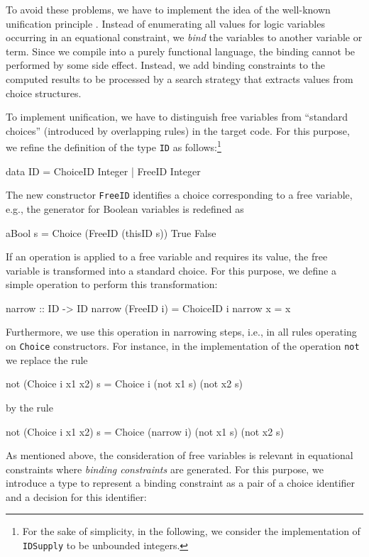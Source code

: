 \documentclass{llncs}
\newcommand{\code}[1]{\mbox{\small\texttt{#1}}}
\begin{document}
To avoid these problems, we have to implement the idea
of the well-known unification principle \cite{Robinson65}.
Instead of enumerating all values for logic variables
occurring in an equational constraint,
we \emph{bind} the variables to another variable or term.
Since we compile into a purely functional language,
the binding cannot be performed by some side effect.
Instead, we add binding constraints to the computed results to be 
processed by a search strategy that extracts values from choice structures.

To implement unification, we have to distinguish free variables
from ``standard choices'' (introduced by overlapping rules)
in the target code. For this purpose, we refine the definition
of the type \code{ID} as follows:\footnote{For the sake
of simplicity, in the following, we consider the
implementation of \code{IDSupply} to be unbounded integers.}
\begin{haskell}
  data ID = ChoiceID Integer | FreeID Integer
\end{haskell}
The new constructor \code{FreeID} identifies a choice corresponding to
a free variable, e.g., the generator for Boolean variables is
redefined as
\begin{haskell}
  aBool s = Choice (FreeID (thisID s)) True False
\end{haskell}
%
If an operation is applied to a free variable and requires its value,
the free variable is transformed into a standard choice.
For this purpose, we define a simple operation to perform
this transformation:
\begin{haskell}
  narrow :: ID -> ID
  narrow (FreeID i) = ChoiceID i
  narrow x          = x
\end{haskell}
Furthermore, we use this operation in narrowing steps,
i.e., in all rules operating on \code{Choice} constructors.
For instance, in the implementation of the operation \code{not}
we replace the rule
\begin{haskell}
  not (Choice i x1 x2) s = Choice i (not x1 s) (not x2 s)
\end{haskell}
by the rule
\begin{haskell}
  not (Choice i x1 x2) s = Choice (narrow i) (not x1 s) (not x2 s)
\end{haskell}
%
As mentioned above, the consideration of free variables
is relevant in equational constraints where \emph{binding constraints} are
generated. For this purpose, we introduce a type to represent
a binding constraint as a pair of a choice identifier
and a decision for this identifier:
\end{document}
